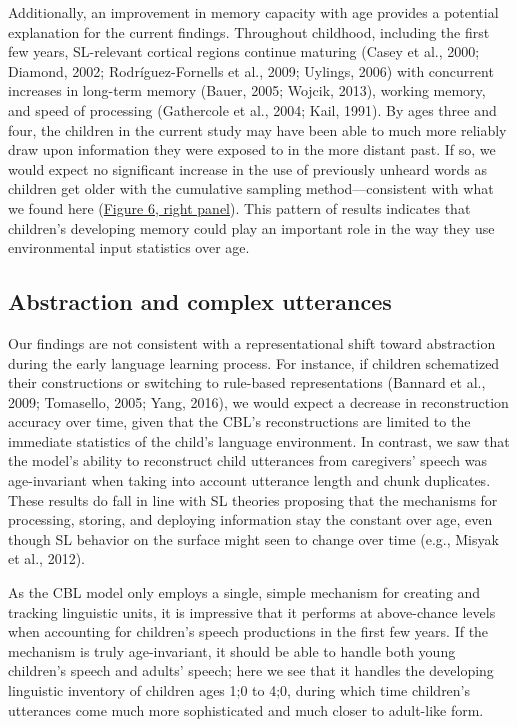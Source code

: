 \documentclass[man,mask,floatsintext]{apa6}
\begin{document}
Additionally, an improvement in memory capacity with age provides a
potential explanation for the current findings. Throughout childhood,
including the first few years, SL-relevant cortical regions continue
maturing (Casey et al., 2000; Diamond, 2002; Rodríguez-Fornells et al.,
2009; Uylings, 2006) with concurrent increases in long-term memory
(Bauer, 2005; Wojcik, 2013), working memory, and speed of processing
(Gathercole et al., 2004; Kail, 1991). By ages three and four, the
children in the current study may have been able to much more reliably
draw upon information they were exposed to in the more distant past. If
so, we would expect no significant increase in the use of previously
unheard words as children get older with the cumulative sampling
method---consistent with what we found here
(\protect\hyperlink{fig6}{Figure 6, right panel}). This pattern of
results indicates that children's developing memory could play an
important role in the way they use environmental input statistics over
age.

\subsection{Abstraction and complex
utterances}\label{abstraction-and-complex-utterances}

Our findings are not consistent with a representational shift toward
abstraction during the early language learning process. For instance, if
children schematized their constructions or switching to rule-based
representations (Bannard et al., 2009; Tomasello, 2005; Yang, 2016), we
would expect a decrease in reconstruction accuracy over time, given that
the CBL's reconstructions are limited to the immediate statistics of the
child's language environment. In contrast, we saw that the model's
ability to reconstruct child utterances from caregivers' speech was
age-invariant when taking into account utterance length and chunk
duplicates. These results do fall in line with SL theories proposing
that the mechanisms for processing, storing, and deploying information
stay the constant over age, even though SL behavior on the surface might
seen to change over time (e.g., Misyak et al., 2012).

As the CBL model only employs a single, simple mechanism for creating
and tracking linguistic units, it is impressive that it performs at
above-chance levels when accounting for children's speech productions in
the first few years. If the mechanism is truly age-invariant, it should
be able to handle both young children's speech and adults' speech; here
we see that it handles the developing linguistic inventory of children
ages 1;0 to 4;0, during which time children's utterances come much more
sophisticated and much closer to adult-like form.
\end{document}
